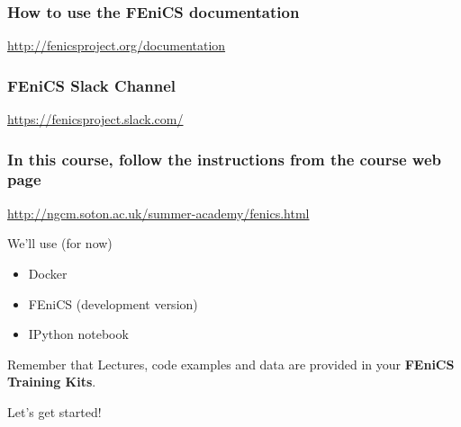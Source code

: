 \documentclass{fenicscourse}
\begin{document}






%

\begin{frame}
  \frametitle{How to use the FEniCS documentation}

  \alert{\url{http://fenicsproject.org/documentation}}

\end{frame}



\begin{frame}
  \frametitle{FEniCS Slack Channel}

  \alert{\url{https://fenicsproject.slack.com/}}

\end{frame}



\begin{frame}[fragile]
\frametitle{In this course, follow the instructions from the course web page}

\bigskip

\alert{\url{http://ngcm.soton.ac.uk/summer-academy/fenics.html}}

\bigskip

We'll use (for now)
\begin{itemize}
\item
  Docker
\item
  FEniCS (development version)
\item
  IPython notebook
\end{itemize}



\bigskip
Remember that Lectures, code examples and data are provided in your
{\bf FEniCS Training Kits}.

\bigskip

\begin{center}
  \alert{Let's get started!}
\end{center}

\end{frame}
\end{document}
